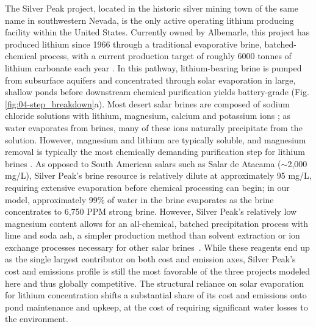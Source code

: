 \documentclass{article}
\renewcommand\_{\textunderscore\allowbreak}
\begin{document}
The Silver Peak project, located in the historic silver mining town of the same name in southwestern Nevada, is the only active operating lithium producing facility within the United States. Currently owned by Albemarle, this project has produced lithium since 1966 through a traditional evaporative brine, batched-chemical process, with a current production target of roughly 6000 tonnes of lithium carbonate each year \cite{srkconsultingSECTechnicalReport2023a}. In this pathway, lithium-bearing brine is pumped from subsurface aquifers and concentrated through solar evaporation in large, shallow ponds before downstream chemical purification yields battery-grade  (Fig. \ref{fig:04-step_breakdown}a). Most desert salar brines are composed of sodium chloride solutions with lithium, magnesium, calcium and potassium ions \cite{garrettHandbookLithiumNatural2004}; as water evaporates from brines, many of these ions naturally precipitate from the solution. However, magnesium and lithium are typically soluble, and magnesium removal is typically the most chemically demanding purification step for lithium brines \cite{torresSalarAtacamaLithium2024, flemingLongrunAvailabilityMineral2024}. As opposed to South American salars such as Salar de Atacama ($\sim$2,000 mg/L), Silver Peak's brine resource is relatively dilute at approximately 95 \si{mg/L}, requiring extensive evaporation before chemical processing can begin; in our model, approximately 99\% of water in the brine evaporates as the brine concentrates to 6,750 PPM strong brine. However, Silver Peak's relatively low magnesium content allows for an all-chemical, batched precipitation process with lime and soda ash, a simpler production method than solvent extraction or ion exchange processes necessary for other salar brines~\cite{srkconsultingSECTechnicalReport2023a, flexerLithiumRecoveryBrines2018}. While these reagents end up as the single largest contributor on both cost and emission axes, Silver Peak's cost and emissions profile is still the most favorable of the three projects modeled here and thus globally competitive. The structural reliance on solar evaporation for lithium concentration shifts a substantial share of its cost and emissions onto pond maintenance and upkeep, at the cost of requiring significant water losses to the environment. 
\end{document}
